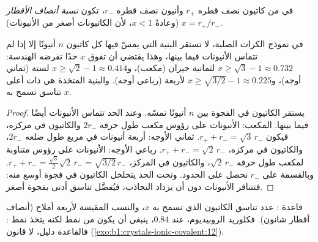 \begin{definition}\label{def:b1:crystals-ionic-covalent:radius-ratio}
في  من كاتيون نصف قطره $r_+$ وأنيون نصف قطره
$r_-$، تكون \emph{نسبة أنصاف الأقطار} $x = r_+/r_-$
(وعادةً $x < 1$، لأن الكاتيونات أصغر من الأنيونات).
\end{definition}

\begin{proposition}\label{prop:b1:crystals-ionic-covalent:rule}
في نموذج الكرات الصلبة، لا تستقر البنية التي يمسّ فيها كل كاتيون $n$
أنيونًا إلا إذا لم تتماس الأنيونات فيما بينها، وهذا
يقتضي أن تفوق $x$ حدًا تفرضه الهندسة: $x \ge \sqrt3 - 1
\approx 0.732$ لثمانية جيران (مكعب)، و$x \ge \sqrt2 - 1 \approx 0.414$
لستة (ثماني أوجه)، و$x \ge \sqrt{3/2} - 1 \approx 0.225$ لأربعة
(رباعي أوجه). والبنية المتخذة هي ذات أعلى تناسق
تسمح به $x$.
\end{proposition}

\begin{proof}
يستقر الكاتيون في الفجوة بين $n$ أنيونًا تمسّه. وعند
الحد تتماس الأنيونات أيضًا فيما بينها. المكعب: الأنيونات على
رؤوس مكعب طول حرفه $2r_-$ والكاتيون في مركزه، فيكون $r_+ +
r_- = \sqrt3\,r_-$. ثماني الأوجه: أربعة أنيونات في مربع طول ضلعه $2r_-$،
والكاتيون في مركزه، $r_+ + r_- = \sqrt2\,r_-$. رباعي الأوجه:
الأنيونات على رؤوس متناوبة لمكعب طول حرفه $\sqrt2\,r_-$، والكاتيون في
المركز، $r_+ + r_- = \frac{\sqrt3}{2}\sqrt2\,r_- = \sqrt{3/2}\,r_-$.
وبالقسمة على $r_-$ نحصل على الحدود. وتحت الحد يتخلخل الكاتيون في
فجوة أوسع منه: فتتنافر الأنيونات دون أن يزداد التجاذب،
فيُفضَّل تناسق أدنى بفجوة أصغر.
\end{proof}

\begin{omfigure}

{\small قاعدة : عدد تناسق الكاتيون الذي
تسمح به $x$، والنسب المقيسة لأربعة أملاح (أنصاف أقطار شانون).
فكلوريد الروبيديوم، عند 0.84، ينبغي أن يكون من نمط  لكنه يتخذ
نمط : فالقاعدة دليل، لا قانون
(\cref{exo:b1:crystals-ionic-covalent:12}).}
\end{omfigure}

